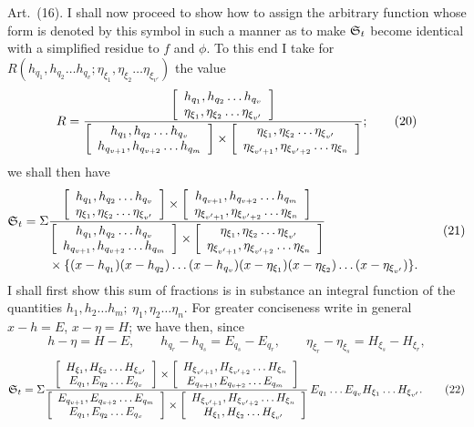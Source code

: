 \documentclass[11pt]{article}
\newcommand{\art}[1]{\par\smallskip\noindent Art.~(#1).\quad}
\begin{document}
\art{16} I shall now proceed to show how to assign the arbitrary function whose form is denoted by this symbol in such a manner as to make $\mathfrak{S}_t$ become identical with a simplified residue to $f$ and $\phi$. To this end I take for $R(h_{q_1},h_{q_2}\ldots h_{q_v};\eta_{\xi_1},\eta_{\xi_2}\ldots\eta_{\xi_{v'}})$ the value
\[
R=\frac{
\left[\begin{array}{c}h_{q_1},h_{q_2}\ldots h_{q_v}\\\eta_{\xi_1},\eta_{\xi_2}\ldots\eta_{\xi_{v'}}\end{array}\right]
}{
\left[\begin{array}{c}h_{q_1},h_{q_2}\ldots h_{q_v}\\h_{q_{v+1}},h_{q_{v+2}}\ldots h_{q_m}\end{array}\right]\times
\left[\begin{array}{c}\eta_{\xi_1},\eta_{\xi_2}\ldots\eta_{\xi_{v'}}\\\eta_{\xi_{v'+1}},\eta_{\xi_{v'+2}}\ldots\eta_{\xi_n}\end{array}\right]
};\tag{20}
\]
we shall then have
\begingroup\scriptsize
\[
\begin{aligned}
\mathfrak{S}_t=\Sigma&\frac{
\left[\begin{array}{c}h_{q_1},h_{q_2}\ldots h_{q_v}\\\eta_{\xi_1},\eta_{\xi_2}\ldots\eta_{\xi_{v'}}\end{array}\right]\times
\left[\begin{array}{c}h_{q_{v+1}},h_{q_{v+2}}\ldots h_{q_m}\\\eta_{\xi_{v'+1}},\eta_{\xi_{v'+2}}\ldots\eta_{\xi_n}\end{array}\right]
}{
\left[\begin{array}{c}h_{q_1},h_{q_2}\ldots h_{q_v}\\h_{q_{v+1}},h_{q_{v+2}}\ldots h_{q_m}\end{array}\right]\times
\left[\begin{array}{c}\eta_{\xi_1},\eta_{\xi_2}\ldots\eta_{\xi_{v'}}\\\eta_{\xi_{v'+1}},\eta_{\xi_{v'+2}}\ldots\eta_{\xi_n}\end{array}\right]
}\,\\[-0.1em]
&\times\{(x-h_{q_1})(x-h_{q_2})\ldots(x-h_{q_v})(x-\eta_{\xi_1})(x-\eta_{\xi_2})\ldots(x-\eta_{\xi_{v'}})\}.
\end{aligned}\tag{21}
\]
\endgroup
I shall first show this sum of fractions is in substance an integral function of the quantities $h_1,h_2\ldots h_m;\ \eta_1,\eta_2\ldots\eta_n$. For greater conciseness write in general $x-h=E$, $x-\eta=H$; we have then, since
\[
h-\eta=H-E,
\qquad h_{q_r}-h_{q_s}=E_{q_s}-E_{q_r},
\qquad \eta_{\xi_r}-\eta_{\xi_s}=H_{\xi_s}-H_{\xi_r},
\]
\begingroup\scriptsize
\[
\mathfrak{S}_t=\Sigma\frac{
\left[\begin{array}{c}H_{\xi_1},H_{\xi_2}\ldots H_{\xi_{v'}}\\E_{q_1},E_{q_2}\ldots E_{q_v}\end{array}\right]\times
\left[\begin{array}{c}H_{\xi_{v'+1}},H_{\xi_{v'+2}}\ldots H_{\xi_n}\\E_{q_{v+1}},E_{q_{v+2}}\ldots E_{q_m}\end{array}\right]
}{
\left[\begin{array}{c}E_{q_{v+1}},E_{q_{v+2}}\ldots E_{q_m}\\E_{q_1},E_{q_2}\ldots E_{q_v}\end{array}\right]\times
\left[\begin{array}{c}H_{\xi_{v'+1}},H_{\xi_{v'+2}}\ldots H_{\xi_n}\\H_{\xi_1},H_{\xi_2}\ldots H_{\xi_{v'}}\end{array}\right]
}
\,E_{q_1}\ldots E_{q_v}H_{\xi_1}\ldots H_{\xi_{v'}}.\tag{22}
\]
\endgroup
\end{document}
